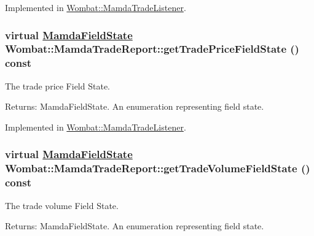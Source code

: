 Implemented in \hyperlink{classWombat_1_1MamdaTradeListener_8d5969ac94475afb4eeeb8b252106e6f}{Wombat::Mamda\-Trade\-Listener}.\hypertarget{classWombat_1_1MamdaTradeReport_338b8a504dc519bff3fc7de0cd882423}{
\subsubsection[getTradePriceFieldState]{\setlength{\rightskip}{0pt plus 5cm}virtual \hyperlink{namespaceWombat_93aac974f2ab713554fd12a1fa3b7d2a}{Mamda\-Field\-State} Wombat::Mamda\-Trade\-Report::get\-Trade\-Price\-Field\-State () const}}
\label{classWombat_1_1MamdaTradeReport_338b8a504dc519bff3fc7de0cd882423}


The trade price Field State. 

\begin{Desc}
\item[Returns:]Mamda\-Field\-State. An enumeration representing field state. \end{Desc}


Implemented in \hyperlink{classWombat_1_1MamdaTradeListener_f1dc31d1863ca41868f8b4a384c7ac46}{Wombat::Mamda\-Trade\-Listener}.\hypertarget{classWombat_1_1MamdaTradeReport_3ce3d260e50a07bc6b9f93f8f866d973}{
\subsubsection[getTradeVolumeFieldState]{\setlength{\rightskip}{0pt plus 5cm}virtual \hyperlink{namespaceWombat_93aac974f2ab713554fd12a1fa3b7d2a}{Mamda\-Field\-State} Wombat::Mamda\-Trade\-Report::get\-Trade\-Volume\-Field\-State () const}}
\label{classWombat_1_1MamdaTradeReport_3ce3d260e50a07bc6b9f93f8f866d973}


The trade volume Field State. 

\begin{Desc}
\item[Returns:]Mamda\-Field\-State. An enumeration representing field state. \end{Desc}


